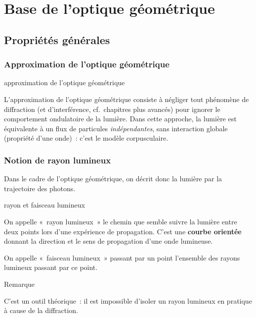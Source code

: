 \documentclass[../main/main.tex]{subfiles}
\begin{document}
\setcounter{chapter}{1}

\chapter{Base de l'optique g\'eom\'etrique}

\section{Propriétés générales}

\subsection{Approximation de l'optique géométrique}

\begin{defi}[label=def:optgeo, hand]{approximation de l'optique géométrique}

    L'approximation de l'optique géométrique consiste à négliger tout phénomène
    de diffraction (et d'interférence, cf.\ chapitres plus avancés) pour ignorer
    le comportement ondulatoire de la lumière. Dans cette approche, la lumière
    est équivalente à un flux de particules \textit{indépendantes}, sans
    interaction globale (propriété d'une onde)~: c'est le modèle corpusculaire.

\end{defi}

\subsection{Notion de rayon lumineux}

Dans le cadre de l'optique géométrique, on décrit donc la lumière par la
trajectoire des photons.

\begin{tcbraster}[raster columns=3, raster equal height=rows]
    \begin{defi}[label=def:rl, raster multicolumn=2]{rayon et faisceau lumineux}

        On appelle «~rayon lumineux~» le chemin que semble suivre la lumière
        entre deux points lors d'une expérience de propagation. C'est une
        \textbf{courbe orientée} donnant la direction et le sens de propagation
        d'une onde lumineuse.\bigbreak

        On appelle «~faisceau lumineux~» passant
        par un point l'ensemble des rayons lumineux passant par ce point.

    \end{defi}
    \begin{NCrema}[]{Remarque}

        C'est un outil théorique~: il est impossible d'isoler un rayon lumineux
        en pratique à cause de la diffraction.

    \end{NCrema}
\end{tcbraster}
\end{document}
